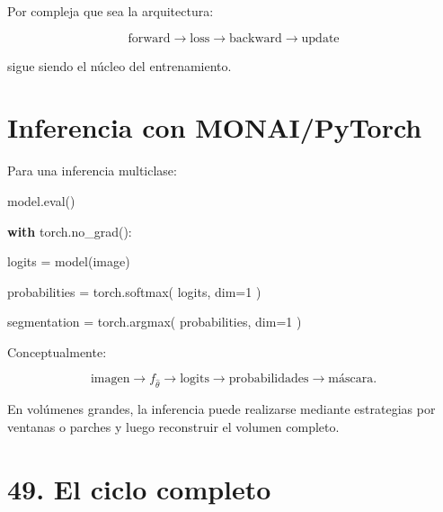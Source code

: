 \documentclass[
  letterpaper,
  DIV=11,
  numbers=noendperiod]{scrartcl}
\newenvironment{Shaded}{\begin{snugshade}}{\end{snugshade}}
\newcommand{\BuiltInTok}[1]{\textcolor[rgb]{0.00,0.23,0.31}{#1}}
\newcommand{\ControlFlowTok}[1]{\textcolor[rgb]{0.00,0.23,0.31}{\textbf{#1}}}
\newcommand{\DecValTok}[1]{\textcolor[rgb]{0.68,0.00,0.00}{#1}}
\newcommand{\NormalTok}[1]{\textcolor[rgb]{0.00,0.23,0.31}{#1}}
\newcommand{\OperatorTok}[1]{\textcolor[rgb]{0.37,0.37,0.37}{#1}}
\begin{document}
Por compleja que sea la arquitectura:

\[
\boxed{
\text{forward}
\rightarrow
\text{loss}
\rightarrow
\text{backward}
\rightarrow
\text{update}
}
\]

sigue siendo el núcleo del entrenamiento.

\section{Inferencia con
MONAI/PyTorch}\label{inferencia-con-monaipytorch}

Para una inferencia multiclase:

\begin{Shaded}
\begin{Highlighting}[]
\NormalTok{model.}\BuiltInTok{eval}\NormalTok{()}

\ControlFlowTok{with}\NormalTok{ torch.no\_grad():}

\NormalTok{    logits }\OperatorTok{=}\NormalTok{ model(image)}

\NormalTok{    probabilities }\OperatorTok{=}\NormalTok{ torch.softmax(}
\NormalTok{        logits,}
\NormalTok{        dim}\OperatorTok{=}\DecValTok{1}
\NormalTok{    )}

\NormalTok{    segmentation }\OperatorTok{=}\NormalTok{ torch.argmax(}
\NormalTok{        probabilities,}
\NormalTok{        dim}\OperatorTok{=}\DecValTok{1}
\NormalTok{    )}
\end{Highlighting}
\end{Shaded}

Conceptualmente:

\[
\text{imagen}
\rightarrow
f_{\hat\theta}
\rightarrow
\text{logits}
\rightarrow
\text{probabilidades}
\rightarrow
\text{máscara}.
\]

En volúmenes grandes, la inferencia puede realizarse mediante
estrategias por ventanas o parches y luego reconstruir el volumen
completo.

\section{49. El ciclo completo}\label{el-ciclo-completo}
\end{document}
